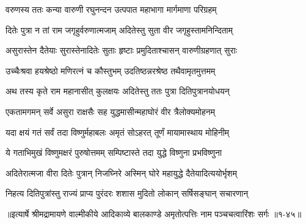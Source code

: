 \twolineshloka
{वरुणस्य ततः कन्या वारुणी रघुनन्दन}
{उत्पपात महाभागा मार्गमाणा परिग्रहम्} %

\twolineshloka
{दितेः पुत्रा न तां राम जगृहुर्वरुणात्मजाम्}
{अदितेस्तु सुता वीर जगृहुस्तामनिन्दिताम्} %

\twolineshloka
{असुरास्तेन दैतेयाः सुरास्तेनादितेः सुताः}
{हृष्टाः प्रमुदिताश्चासन् वारुणीग्रहणात् सुराः} %

\twolineshloka
{उच्चैःश्रवा हयश्रेष्ठो मणिरत्नं च कौस्तुभम्}
{उदतिष्ठन्नरश्रेष्ठ तथैवामृतमुत्तमम्} %

\twolineshloka
{अथ तस्य कृते राम महानासीत् कुलक्षयः}
{अदितेस्तु ततः पुत्रा दितिपुत्रानयोधयन्} %

\twolineshloka
{एकतामगमन् सर्वे असुरा राक्षसैः सह}
{युद्धमासीन्महाघोरं वीर त्रैलोक्यमोहनम्} %

\twolineshloka
{यदा क्षयं गतं सर्वं तदा विष्णुर्महाबलः}
{अमृतं सोऽहरत् तूर्णं मायामास्थाय मोहिनीम्} %

\twolineshloka
{ये गताभिमुखं विष्णुमक्षरं पुरुषोत्तमम्}
{सम्पिष्टास्ते तदा युद्धे विष्णुना प्रभविष्णुना} %

\twolineshloka
{अदितेरात्मजा वीरा दितेः पुत्रान् निजघ्निरे}
{अस्मिन् घोरे महायुद्धे दैतेयादित्ययोर्भृशम्} %

\twolineshloka
{निहत्य दितिपुत्रांस्तु राज्यं प्राप्य पुरंदरः}
{शशास मुदितो लोकान् सर्षिसङ्घान् सचारणान्} %


॥इत्यार्षे श्रीमद्रामायणे वाल्मीकीये आदिकाव्ये बालकाण्डे अमृतोत्पत्तिः नाम पञ्चचत्वारिंशः सर्गः ॥१-४५॥

